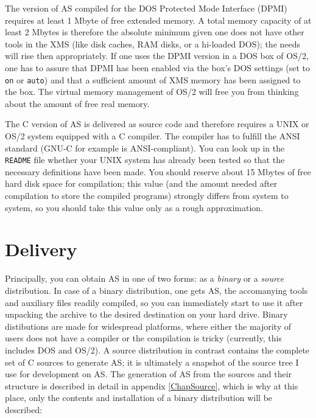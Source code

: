 \documentclass[12pt,twoside]{report}
\newcommand{\tty}[1]{{\tt #1}}
\newcommand{\asname}{{AS}}
\begin{document}
The version of \asname{}  compiled for the DOS Protected
Mode Interface (DPMI) requires at least 1 Mbyte of free extended memory.
A total memory capacity of at least 2 Mbytes is therefore the absolute
minimum given one does not have other tools in the XMS (like disk caches,
RAM disks, or a hi-loaded DOS); the needs will rise then appropriately.
If one uses the DPMI version in a DOS box of OS/2, one has to assure that
DPMI has been enabled via the box's DOS settings (set to \tty{on} or
\tty{auto}) and that a sufficient amount of XMS memory has been assigned
to the box.  The virtual memory management of OS/2 will free you
from thinking about the amount of free real memory.

The C version of \asname{}  is delivered as source code and
therefore requires a UNIX or OS/2 system equipped with a C compiler.  The
compiler has to fulfill the ANSI standard (GNU-C for example is
ANSI-compliant).  You can look up in the \tty{README} file whether your
UNIX system has already been tested so that the necessary definitions have
been made.  You should reserve about 15 Mbytes of free hard disk space for
compilation; this value (and the amount needed after compilation to store
the compiled programs) strongly differs from system to system, so you
should take this value only as a rough approximation.


\section{Delivery}

Principally, you can obtain \asname{} in one of two forms: as a {\em binary} or a
{\em source} distribution.  In case of a binary distribution, one gets \asname{},
the accomanying tools and auxiliary files readily compiled, so you can
immediately start to use it after unpacking the archive to the desired
destination on your hard drive.
Binary distibutions are made for widespread platforms, where either the
majority of users does not have a compiler or the compilation is tricky
(currently, this includes DOS and OS/2).  A source distribution in
contrast contains the complete set of C sources to generate \asname{}; it is
ultimately a snapshot of the source tree I use for development on \asname{}.  The
generation of \asname{} from the sources and their structure is described in
detail in appendix \ref{ChapSource}, which is why at this place, only the
contents and installation of a binary distribution will be described:
\end{document}
